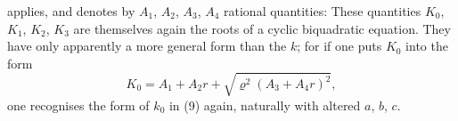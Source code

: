 applies, and denotes by $A_1$, $A_2$, $A_3$, $A_4$ rational quantities:
These quantities $K_0$, $K_1$, $K_2$, $K_3$ are themselves again the roots of a cyclic biquadratic equation. They have only apparently a more general form than the $k$; for if one puts $K_0$ into the form
\[
K_0 = A_1 + A_2 r + \sqrt{\varrho^2(A_3+A_4 r)^2},
\]
one recognises the form of $k_0$ in (9) again, naturally with altered $a$, $b$, $c$.
